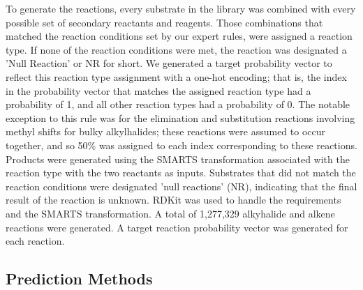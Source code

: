 To generate the reactions, every substrate in the library was combined with every possible set of secondary reactants and reagents. Those combinations that matched the reaction conditions set by our expert rules, were assigned a reaction type. If none of the reaction conditions were met, the reaction was designated a 'Null Reaction' or NR for short. We generated a target probability vector to reflect this reaction type assignment with a one-hot encoding; that is, the index in the probability vector that matches the assigned reaction type had a probability of 1, and all other reaction types had a probability of 0. The notable exception to this rule was for the elimination and substitution reactions involving methyl shifts for bulky alkylhalides; these reactions were assumed to occur together, and so 50\% was assigned to each index corresponding to these reactions. Products were generated using the SMARTS transformation associated with the reaction type with the two reactants as inputs. Substrates that did not match the reaction conditions were designated 'null reactions' (NR), indicating that the final result of the reaction is unknown. RDKit \cite{landrum2006rdkit} was used to handle the requirements and the SMARTS transformation. A total of 1,277,329 alkyhalide and alkene reactions were generated. A target reaction probability vector was generated for each reaction. 

\subsection{Prediction Methods }


